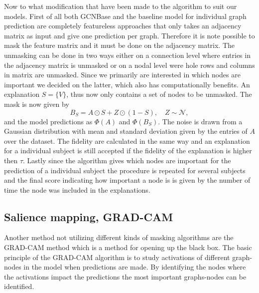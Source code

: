 Now to what modification that have been made to the algorithm to suit our models. First of all both GCNBase and the baseline model for individual graph prediction are completely featureless approaches that only takes an adjacency matrix as input and give one prediction per graph. Therefore it is note possible to mask the feature matrix and it must be done on the adjacency matrix. The unmasking can be done in two ways either on a connection level where entries in the adjacency matrix is unmasked or on a nodal level were hole rows and columns in matrix are unmasked. Since we primarily are interested in which nodes are important we decided on the latter, which also has computationally benefits. An explanation $S = \{V\}$, thus now only contains a set of nodes to be unmasked. The mask is now given by 
\begin{equation*}
    B_S = A \odot S + Z \odot (1- S), \quad Z \sim \mathcal{N},
\end{equation*}
and the model predictions as $\Phi(A)$ and $\Phi(B_S)$. The noise is drawn from a Gaussian distribution with mean and standard deviation given by the entries of $A$ over the dataset. The fidelity are calculated in the same way and an explanation for a individual subject is still accepted if the fidelity of the explanation is higher then $\tau$. Lastly since the algorithm gives which nodes are important for the prediction of a individual subject the procedure is repeated for several subjects and the final score indicating how important a node is is given by the number of time the node was included in the explanations. 




\subsection{Salience mapping, GRAD-CAM}
Another method not utilizing different kinds of masking algorithms are the GRAD-CAM method which is a method for opening up the black box. The basic principle of the GRAD-CAM algorithm is to study activations of different graph-nodes in the model when predictions are made. By identifying the nodes where the activations impact the predictions the most important graphs-nodes can be identified. 

